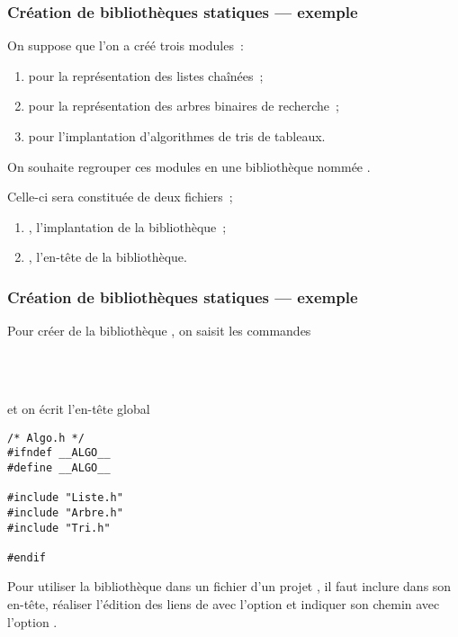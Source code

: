 \begin{frame}[fragile]
\frametitle{Création de bibliothèques statiques --- exemple}
On suppose que l'on a créé trois modules~:
\begin{enumerate}
    \item {} pour la représentation des listes chaînées~;
    \smallskip

    \item {} pour la représentation des arbres binaires de
    recherche~;
    \smallskip

    \item {} pour l'implantation d'algorithmes de tris de tableaux.
\end{enumerate}
\bigskip
\bigskip

On souhaite regrouper ces modules en une bibliothèque nommée .
\medskip

Celle-ci sera constituée de deux fichiers~;
\begin{enumerate}
    \item {}, l'implantation de la bibliothèque~;
    \smallskip

    \item {}, l'en-tête de la bibliothèque.
\end{enumerate}
\end{frame}

\begin{frame}[fragile]
\frametitle{Création de bibliothèques statiques --- exemple}
Pour créer de la bibliothèque , on saisit les commandes
\smallskip

\begin{small}
 \\
 \\
\end{small}
\smallskip

et on écrit l'en-tête global
\begin{center}
\begin{minipage}[c]{.3\textwidth}
\begin{lstlisting}[frame=single,numbers=none,basicstyle=\scriptsize\tt]
/* Algo.h */
#ifndef __ALGO__
#define __ALGO__

#include "Liste.h"
#include "Arbre.h"
#include "Tri.h"

#endif
\end{lstlisting}
\end{minipage}
\end{center}
\medskip

Pour utiliser la bibliothèque  dans un fichier  d'un
projet , il faut inclure dans  son en-tête, réaliser
l'édition des liens de  avec l'option  et indiquer
son chemin  avec l'option .
\end{frame}

